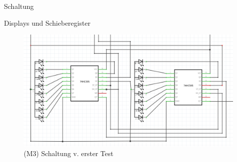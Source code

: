 \documentclass[mathserif,9pt]{article}
\begin{document}
    \begin{frame}{Schaltung}
        \begin{block}{Displays und Schieberegister}
               \begin{figure}
                    \centering
                    \includegraphics[height=0.5\paperheight]{img/bitshift-register_2x.png}
                    \caption[M3]{(M3) Schaltung v. erster Test}
                    \label{fig:bitshift_2x}
               \end{figure}
        \end{block}
    \end{frame}
\end{document}
